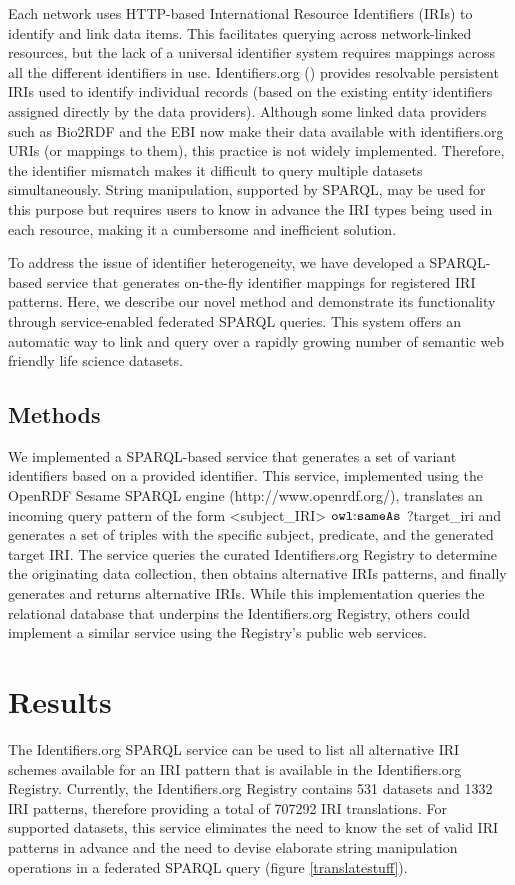 \documentclass{bioinfo}
\begin{document}
Each network uses HTTP-based International Resource Identifiers (IRIs) to identify and link data items. This facilitates querying across network-linked resources, but the lack of a universal identifier system requires mappings across all the different identifiers in use. Identifiers.org (\cite{Juty01012012}) provides resolvable persistent IRIs used to identify individual records (based on the existing entity identifiers assigned directly by the data providers). Although some linked data providers such as Bio2RDF and the EBI now make their data available with identifiers.org URIs (or mappings to them), this practice is not widely implemented. Therefore, the identifier mismatch makes it difficult to query multiple datasets simultaneously.  String manipulation, supported by SPARQL, may be used for this purpose but requires users to know in advance the IRI types being used in each resource, making it a cumbersome and inefficient solution. 
 
To address the issue of identifier heterogeneity, we have developed a SPARQL-based service that generates on-the-fly identifier mappings for registered IRI patterns. Here, we describe our novel method and demonstrate its functionality through service-enabled federated SPARQL queries. This system offers an automatic way to link and query over a rapidly growing number of semantic web friendly life science datasets.

\begin{methods}
\section{Methods}
We implemented a SPARQL-based service that generates a set of variant identifiers based on a provided identifier. This service, implemented using the OpenRDF Sesame SPARQL engine (http://www.openrdf.org/), translates an incoming query pattern of the form <subject_IRI> $\mathtt{owl\text{\rm :}{}sameAs}$ ?target_iri and generates a set of triples with the specific subject, predicate, and the generated target IRI. The service queries the curated Identifiers.org Registry to determine the originating data collection, then obtains alternative IRIs patterns, and finally generates and returns alternative IRIs. While this implementation queries the relational database that underpins the Identifiers.org Registry, others could implement a similar service using the Registry's public web services.
\end{methods}

\section{Results}
The Identifiers.org SPARQL service can be used to list all alternative IRI schemes available for an IRI pattern that is available in the Identifiers.org Registry. Currently, the Identifiers.org Registry contains 531 datasets and 1332 IRI patterns, therefore providing a total of 707292 IRI translations. For supported datasets, this service eliminates the need to know the set of valid IRI patterns in advance and the need to devise elaborate string manipulation operations in a federated SPARQL query (figure \ref{translatestuff}).
\end{document}
